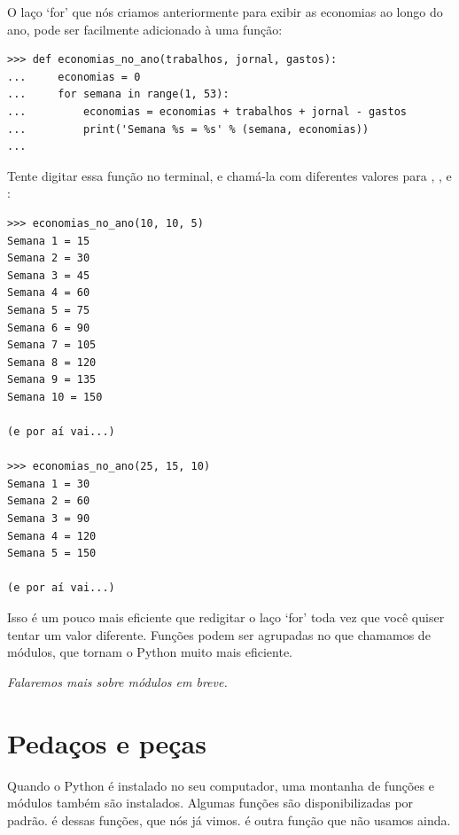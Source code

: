 O laço `for' que nós criamos anteriormente para exibir as economias ao longo do ano, pode ser facilmente adicionado à uma função:

\begin{listing}
\begin{verbatim}
>>> def economias_no_ano(trabalhos, jornal, gastos):
...     economias = 0
...     for semana in range(1, 53):
...         economias = economias + trabalhos + jornal - gastos
...         print('Semana %s = %s' % (semana, economias))
...
\end{verbatim}
\end{listing}

Tente digitar essa função no terminal, e chamá-la com diferentes valores para , , e :

\begin{listing}
\begin{verbatim}
>>> economias_no_ano(10, 10, 5)
Semana 1 = 15
Semana 2 = 30
Semana 3 = 45
Semana 4 = 60
Semana 5 = 75
Semana 6 = 90
Semana 7 = 105
Semana 8 = 120
Semana 9 = 135
Semana 10 = 150

(e por aí vai...)

>>> economias_no_ano(25, 15, 10)
Semana 1 = 30
Semana 2 = 60
Semana 3 = 90
Semana 4 = 120
Semana 5 = 150

(e por aí vai...)
\end{verbatim}
\end{listing}

Isso é um pouco mais eficiente que redigitar o laço `for' toda vez que você quiser tentar um valor diferente. Funções podem ser agrupadas no que chamamos de módulos, que tornam o Python muito mais eficiente.
\par
\noindent
\emph{Falaremos mais sobre módulos em breve.}

\section{Pedaços e peças}

Quando o Python é instalado no seu computador, uma montanha de funções e módulos também são instalados. Algumas funções são disponibilizadas por padrão.  é dessas funções, que nós já vimos.  é outra função que não usamos ainda.

